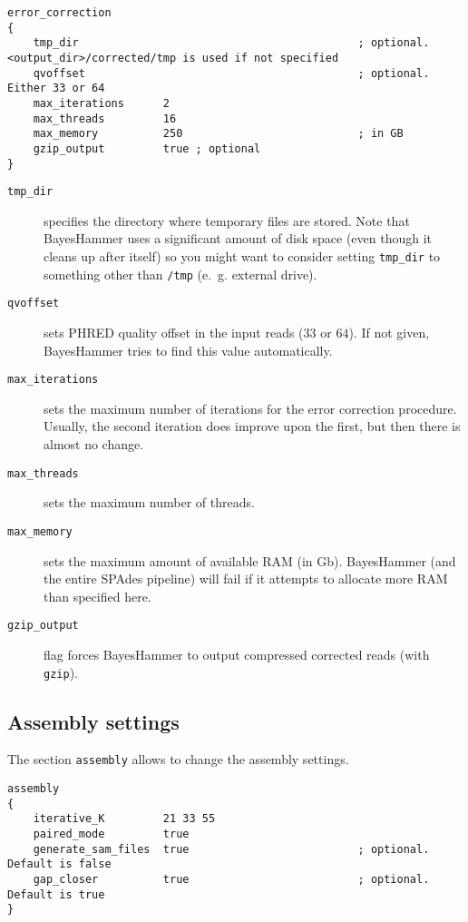 \documentclass{article}
\def\spades{SPAdes}
\def\bh{BayesHammer}
\begin{document}
\begin{lstlisting}
error_correction
{
    tmp_dir                                           ; optional. <output_dir>/corrected/tmp is used if not specified
    qvoffset                                          ; optional. Either 33 or 64
    max_iterations      2
    max_threads         16
    max_memory          250                           ; in GB
    gzip_output         true ; optional
}
\end{lstlisting}

\begin{description}
\item[{\tt tmp\_dir}] specifies the directory where temporary files are stored. Note that {\bh} uses a significant amount of disk space (even though it
cleans up after itself) so you might want to consider setting {\tt tmp\_dir} to something other than {\tt /tmp} (e.~g. external drive).
\item[{\tt qvoffset}] sets PHRED quality offset in the input reads ($33$ or $64$). If not given, {\bh} tries to find this value automatically.
\item[{\tt max\_iterations}] sets the maximum number of iterations
for the error correction procedure. Usually, the second iteration does improve upon the first, but then there is almost no change.
\item[{\tt max\_threads}] sets the maximum number of threads.
\item[{\tt max\_memory}] sets the maximum amount of available RAM (in Gb). {\bh} (and the entire {\spades} pipeline) will fail if it attempts
to allocate more RAM than specified here.
\item[{\tt gzip\_output}] flag forces {\bh} to output compressed corrected reads (with {\tt gzip}).
\end{description}

\subsection{Assembly settings}\label{subsec:assembly}
The section {\tt assembly} allows to change the assembly settings. 

\begin{lstlisting}
assembly
{
    iterative_K         21 33 55
    paired_mode         true
    generate_sam_files  true                          ; optional. Default is false
    gap_closer          true                          ; optional. Default is true
}
\end{lstlisting}
\end{document}
